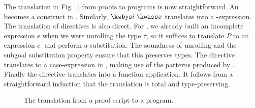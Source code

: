 The translation in Fig.~\ref{fig:translation} from proofs to \Beluga{} programs
is now straightforward. An \kwunbox{} becomes a \tletboxs
construct in \Beluga. Similarly, $\kwbys i\;\kwass x$ translates into
a \tlet-expression. The translation of directives is also direct. For
\kwintros, we already built an incomplete expression $e$ when we were unrolling
the type $\tau$, so it suffices to translate $P$ to an expression $e^\prime$ and
perform a substitution. The soundness of unrolling and the subgoal substitution
property ensure that this preserves types.
The \kwsplit{} directive translates to
a case-expression in \Beluga{}, making use of the patterns produced by \scov.
Finally the \kwsuffices{} directive translates into a function application.
It follows from a straightforward induction that the translation is total and
type-preserving.

\begin{figure}[h]
  
  \caption{%
    The translation from a \Harpoon{} proof script to a \Beluga{} program.%
  }%
  \label{fig:translation}
\end{figure}%
%
